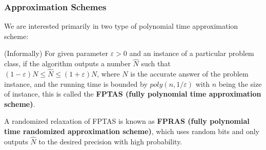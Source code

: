 \documentclass[mathserif]{beamer}
\newcommand{\eps}{\varepsilon}
\begin{document}
\begin{frame}
	\frametitle{Approximation Schemes}
	We are interested primarily in two type of polynomial time approximation scheme:
	\pause
	\begin{definition}
		(Informally) For given parameter $\eps > 0$ and an instance of a particular problem class, if the algorithm outputs a number $\hat{N}$ such that $(1-\eps) N \leq \hat{N} \leq (1+\eps) N$, where $N$ is the accurate answer of the problem instance, and the running time is bounded by $poly(n, 1/ \eps)$ with $n$ being the size of instance, this is called the {\bf FPTAS (fully polynomial time approximation scheme)}.

		A randomized relaxation of FPTAS is known as {\bf FPRAS (fully polynomial time randomized approximation scheme)}, which uses random bits and only outputs $\hat{N}$ to the desired precision with high probability.
	\end{definition}
\end{frame}
\end{document}
